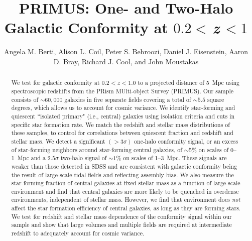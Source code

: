 \documentclass[apj,tighten,iop]{emulateapj2}
\begin{document}
\title{PRIMUS: One- and Two-Halo Galactic Conformity at $0.2<\,$\MakeLowercase{\emph{z}}$\,<1$}

\author{Angela M. Berti,
	Alison L. Coil,
	Peter S. Behroozi,
	Daniel J. Eisenstein,
	Aaron D. Bray,
	Richard J. Cool, and
	John Moustakas
}


\begin{abstract}

We test for galactic conformity at $0.2<z<1.0$ to a projected distance of 
5~Mpc using spectroscopic redshifts from the PRism MUlti-object Survey (PRIMUS).
Our sample consists of $\sim60,000$ galaxies in five separate fields covering 
a total of $\sim5.5$ square degrees, which allows us to account for cosmic 
variance.
We identify star-forming and quiescent ``isolated primary" (i.e., central) 
galaxies using isolation criteria and cuts in specific star formation rate.
We match the redshift and stellar mass distributions of these samples, to 
control for correlations between quiescent fraction and redshift and stellar 
mass.
We detect a significant $(>3\sigma)$ one-halo conformity signal, or an 
excess of star-forming neighbors around star-forming central galaxies, 
of $\sim5$\% 
on scales of 0--1~Mpc and a $2.5\sigma$ two-halo signal of $\sim1$\% on scales 
of 1--3~Mpc.
These signals are weaker than those detected in SDSS and are 
consistent with galactic conformity being the result of large-scale tidal fields 
and reflecting assembly bias.
We also measure the star-forming fraction of central galaxies at fixed stellar 
mass as a function of large-scale environment and find that central galaxies 
are more likely to be quenched in overdense environments, independent of 
stellar mass.
However, we find that environment does \emph{not} affect the star formation 
efficiency of central galaxies, as long as they are forming stars.
We test for redshift and stellar mass dependence of the conformity signal 
within our sample and show that large volumes and multiple fields are 
required at intermediate redshift to adequately account for cosmic variance.

\end{abstract}
\end{document}
